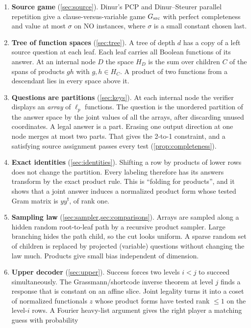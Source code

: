 \documentclass[11pt]{article}
\theoremstyle{definition}
\theoremstyle{remark}
\begin{document}
\begin{enumerate}[leftmargin=*]
\item \textbf{Source game} (\cref{sec:source}). Dinur's PCP and Dinur--Steurer
parallel repetition give a clause-versus-variable game $G_{\rm src}$ with
perfect completeness and value at most $\sigma$ on NO instances, where
$\sigma$ is a small constant chosen last.
\item \textbf{Tree of function spaces} (\cref{sec:tree}). A tree of depth $d$
has a copy of a left source question at each leaf. Each leaf carries all
Boolean functions of its answer. At an internal node $D$ the space $H_D$ is
the sum over children $C$ of the spans of products $gh$ with
$g,h\in H_C$. A product of two functions from a descendant lies in every
space above it.
\item \textbf{Questions are partitions} (\cref{sec:keys}). At each internal
node the verifier displays an \emph{array} of $\ell_p$ functions. The question
is the unordered partition of the answer space by the joint values of all the
arrays, after discarding unused coordinates. A legal answer is a part. Erasing
one output direction at one node merges at most two parts. That gives the
2-to-1 constraint, and a satisfying source assignment passes every test
(\cref{prop:completeness}).
\item \textbf{Exact identities} (\cref{sec:identities}). Shifting a row by
products of lower rows does not change the partition. Every labeling therefore
has its answers transform by the exact product rule. This is ``folding for
products'', and it shows that a joint answer induces a normalized product form
whose tested Gram matrix is $yy^{\mathsf t}$, of rank one.
\item \textbf{Sampling law} (\cref{sec:sampler,sec:comparisons}). Arrays are
sampled along a hidden random root-to-leaf path by a recursive product
sampler. Large branching hides the path child, so the cut looks uniform. A
sparse random set of children is replaced by projected (variable) questions
without changing the law much. Products give small bias independent of
dimension.
\item \textbf{Upper decoder} (\cref{sec:upper}). Success forces two levels
$i<j$ to succeed simultaneously. The Grassmann/shortcode inverse theorem at
level $j$ finds a response that is constant on an affine slice. Joint
legality turns it into a coset of normalized functionals $z$ whose product
forms have tested rank $\le1$ on the level-$i$ rows. A Fourier heavy-list
argument gives the right player a matching guess with probability

\end{enumerate}
\end{document}

